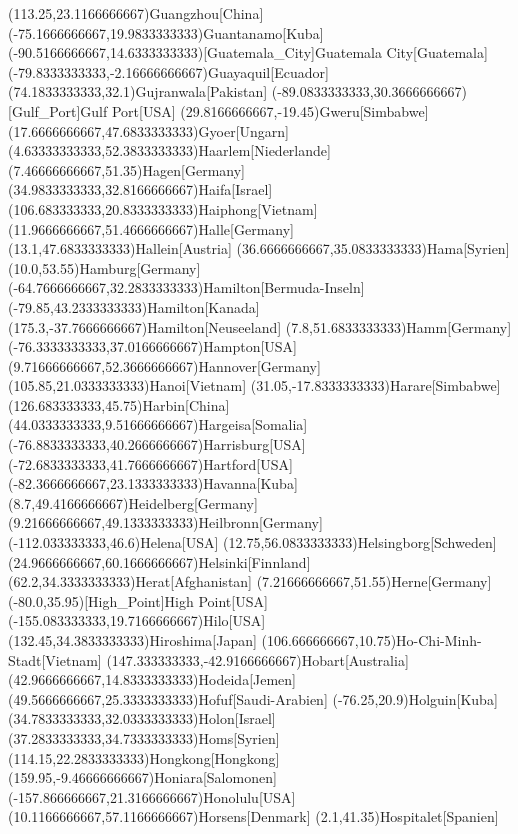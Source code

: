 \mapput(113.25,23.1166666667){Guangzhou}[China]
\mapput(-75.1666666667,19.9833333333){Guantanamo}[Kuba]
\mapput(-90.5166666667,14.6333333333)[Guatemala_City]{Guatemala City}[Guatemala]
\mapput(-79.8333333333,-2.16666666667){Guayaquil}[Ecuador]
\mapput(74.1833333333,32.1){Gujranwala}[Pakistan]
\mapput(-89.0833333333,30.3666666667)[Gulf_Port]{Gulf Port}[USA]
\mapput(29.8166666667,-19.45){Gweru}[Simbabwe]
\mapput(17.6666666667,47.6833333333){Gyoer}[Ungarn]
\mapput(4.63333333333,52.3833333333){Haarlem}[Niederlande]
\mapput(7.46666666667,51.35){Hagen}[Germany]
\mapput(34.9833333333,32.8166666667){Haifa}[Israel]
\mapput(106.683333333,20.8333333333){Haiphong}[Vietnam]
\mapput(11.9666666667,51.4666666667){Halle}[Germany]
\mapput(13.1,47.6833333333){Hallein}[Austria]
\mapput(36.6666666667,35.0833333333){Hama}[Syrien]
\mapput(10.0,53.55){Hamburg}[Germany]
\mapput(-64.7666666667,32.2833333333){Hamilton}[Bermuda-Inseln]
\mapput(-79.85,43.2333333333){Hamilton}[Kanada]
\mapput(175.3,-37.7666666667){Hamilton}[Neuseeland]
\mapput(7.8,51.6833333333){Hamm}[Germany]
\mapput(-76.3333333333,37.0166666667){Hampton}[USA]
\mapput(9.71666666667,52.3666666667){Hannover}[Germany]
\mapput(105.85,21.0333333333){Hanoi}[Vietnam]
\mapput(31.05,-17.8333333333){Harare}[Simbabwe]
\mapput(126.683333333,45.75){Harbin}[China]
\mapput(44.0333333333,9.51666666667){Hargeisa}[Somalia]
\mapput(-76.8833333333,40.2666666667){Harrisburg}[USA]
\mapput(-72.6833333333,41.7666666667){Hartford}[USA]
\mapput(-82.3666666667,23.1333333333){Havanna}[Kuba]
\mapput(8.7,49.4166666667){Heidelberg}[Germany]
\mapput(9.21666666667,49.1333333333){Heilbronn}[Germany]
\mapput(-112.033333333,46.6){Helena}[USA]
\mapput(12.75,56.0833333333){Helsingborg}[Schweden]
\mapput(24.9666666667,60.1666666667){Helsinki}[Finnland]
\mapput(62.2,34.3333333333){Herat}[Afghanistan]
\mapput(7.21666666667,51.55){Herne}[Germany]
\mapput(-80.0,35.95)[High_Point]{High Point}[USA]
\mapput(-155.083333333,19.7166666667){Hilo}[USA]
\mapput(132.45,34.3833333333){Hiroshima}[Japan]
\mapput(106.666666667,10.75){Ho-Chi-Minh-Stadt}[Vietnam]
\mapput(147.333333333,-42.9166666667){Hobart}[Australia]
\mapput(42.9666666667,14.8333333333){Hodeida}[Jemen]
\mapput(49.5666666667,25.3333333333){Hofuf}[Saudi-Arabien]
\mapput(-76.25,20.9){Holguin}[Kuba]
\mapput(34.7833333333,32.0333333333){Holon}[Israel]
\mapput(37.2833333333,34.7333333333){Homs}[Syrien]
\mapput(114.15,22.2833333333){Hongkong}[Hongkong]
\mapput(159.95,-9.46666666667){Honiara}[Salomonen]
\mapput(-157.866666667,21.3166666667){Honolulu}[USA]
\mapput(10.1166666667,57.1166666667){Horsens}[Denmark]
\mapput(2.1,41.35){Hospitalet}[Spanien]
